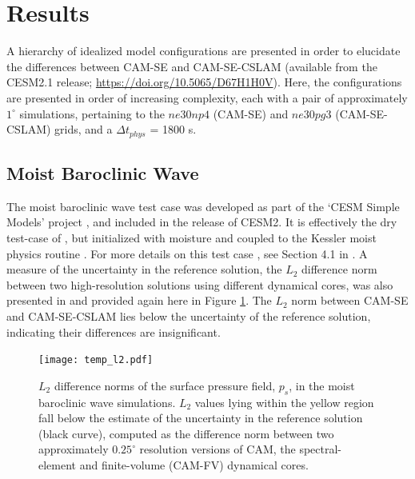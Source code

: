 \documentclass{ametsoc}
\begin{document}
\section{Results}\label{sec:results}

A hierarchy of idealized model configurations are presented in order to elucidate the differences between CAM-SE and CAM-SE-CSLAM (available from the CESM2.1 release; \url{https://doi.org/10.5065/D67H1H0V}). Here, the configurations are presented in order of increasing complexity, each with a pair of approximately $1^{\circ}$ simulations, pertaining to the $ne30np4$ (CAM-SE) and $ne30pg3$ (CAM-SE-CSLAM) grids, and a $\Delta t_{phys}$ = 1800 s.

\subsection{Moist Baroclinic Wave}

The moist baroclinic wave test case was developed as part of the `CESM Simple Models' project \citep{CESM_SIMPLER_MODELS}, and included in the release of CESM2. It is effectively the dry test-case of \cite{UMJS2014QJRMS}, but initialized with moisture and coupled to the Kessler moist physics routine \citep{K1969MM}. For more details on this test case \cite[which was part of the 2016 Dynamical Core Model Intercomparison Project, ][]{DCMIP16}, see Section 4.1 in \cite{LetAl2018JAMES}. A measure of the uncertainty in the reference solution, the $L_2$ difference norm between two high-resolution solutions using different dynamical cores, was also presented in \cite{LetAl2018JAMES} and provided again here in Figure \ref{fig:norm}. The $L_2$ norm between CAM-SE and CAM-SE-CSLAM lies below the uncertainty of the reference solution, indicating their differences are insignificant.

\begin{figure}[t]
\begin{center}
\noindent\texttt{[image: temp\_l2.pdf]}\\
\end{center}
\caption{$L_2$ difference norms of the surface pressure field, $p_s$, in the moist baroclinic wave simulations. $L_2$ values lying within the yellow region fall below the estimate of the uncertainty in the reference solution (black curve), computed as the difference norm between two approximately $0.25^\circ$ resolution versions of CAM, the spectral-element and finite-volume (CAM-FV) dynamical cores.}
\label{fig:norm}
\end{figure}
\end{document}
